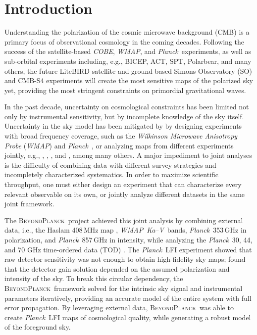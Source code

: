 \documentclass[twocolumn]{../../common/aa}
\def\WMAP{\emph{WMAP}}
\def\COBE{\emph{COBE}}
\def\Planck{\emph{Planck}}
\newcommand{\bp}{\textsc{BeyondPlanck}}
\newcommand{\Ka}[0]{\textit{Ka}}
\newcommand{\V}[0]{\textit V}
\begin{document}
\maketitle

\tableofcontents




\section{Introduction}
\label{sec:introduction}

Understanding the polarization of the cosmic microwave background (CMB) is a primary focus of observational cosmology in the coming decades. Following the success of the satellite-based \COBE, \WMAP, and \Planck\ experiments, as well as sub-orbital experiments including, e.g., BICEP, ACT, SPT, Polarbear, and many others, the future LiteBIRD satellite and ground-based Simons Observatory (SO) and CMB-S4 experiments will create the most sensitive maps of the polarized sky yet, providing the most stringent constraints on primordial gravitational waves.

In the past decade, uncertainty on cosmological constraints has been limited not only by instrumental sensitivity, but by incomplete knowledge of the sky itself. Uncertainty in the sky model has been mitigated by by designing experiments with broad frequency coverage, such as the \textit{Wilkinson Microwave Anisotropy Probe} (\WMAP) \citep{bennett2012} and \Planck\ \citep{planck2016-l01}, or analyzing maps from different experiments jointly, e.g., \citet{dmr}, \citet{bennett2012}, \citet{planck2014-a12}, and \citet{pb2015}, among many others.
A major impediment to joint analyses is the difficulty of combining data with different survey strategies and incompletely characterized systematics. In order to maximize scientific throughput, one must either design an experiment that can characterize every relevant observable on its own, or jointly analyze different datasets in the same joint framework.

The \bp\ project achieved this joint analysis by combining external data, i.e., the Haslam 408\,MHz map \citep{haslam1982}, \WMAP\ \Ka--\V\ bands, \Planck\ 353\,GHz in polarization, and \Planck\ 857\,GHz in intensity, while analyzing the \Planck\ 30, 44, and 70 GHz time-ordered data (TOD) \citep{bp01}.
The \Planck\ LFI experiment showed that raw detector sensitivity was not enough to obtain high-fidelity sky maps; \citet{planck2016-l02} found that the detector gain solution depended on the assumed polarization and intensity of the sky. To break this circular dependency, the \bp\ framework solved for the intrinsic sky signal and instrumental parameters iteratively, providing an accurate model of the entire system with full error propagation. By leveraging external data, \bp\ was able to create \Planck\ LFI maps of cosmological quality, while generating a robust model of the foreground sky.
\end{document}
